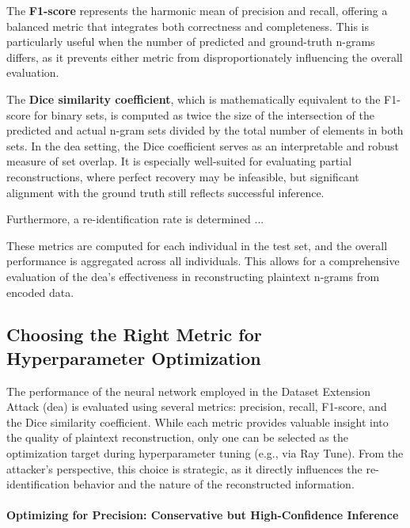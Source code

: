 The \textbf{F1-score} represents the harmonic mean of precision and recall, offering a balanced metric that integrates both correctness and completeness.
This is particularly useful when the number of predicted and ground-truth n-grams differs, as it prevents either metric from disproportionately influencing the overall evaluation.

The \textbf{Dice similarity coefficient}, which is mathematically equivalent to the F1-score for binary sets, is computed as twice the size of the intersection of the predicted and actual n-gram sets divided by the total number of elements in both sets.
In the \ac{dea} setting, the Dice coefficient serves as an interpretable and robust measure of set overlap.
It is especially well-suited for evaluating partial reconstructions, where perfect recovery may be infeasible, but significant alignment with the ground truth still reflects successful inference.


Furthermore, a re-identification rate is determined ... %


These metrics are computed for each individual in the test set, and the overall performance is aggregated across all individuals.
This allows for a comprehensive evaluation of the \ac{dea}'s effectiveness in reconstructing plaintext n-grams from encoded data.

\subsection{Choosing the Right Metric for Hyperparameter Optimization}


The performance of the neural network employed in the Dataset Extension Attack (\ac{dea}) is evaluated using several metrics: precision, recall, F1-score, and the Dice similarity coefficient.
While each metric provides valuable insight into the quality of plaintext reconstruction, only one can be selected as the optimization target during hyperparameter tuning (e.g., via Ray Tune).
From the attacker's perspective, this choice is strategic, as it directly influences the re-identification behavior and the nature of the reconstructed information.

\paragraph{Optimizing for Precision: Conservative but High-Confidence Inference}

